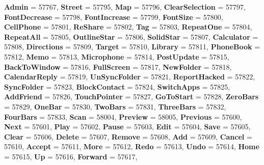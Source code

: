 \begin{DoxyCompactItemize}
{\bfseries Admin} = 57767, 
{\bfseries Street} = 57795, 
{\bfseries Map} = 57796, 
\newline
{\bfseries Clear\+Selection} = 57797, 
{\bfseries Font\+Decrease} = 57798, 
{\bfseries Font\+Increase} = 57799, 
{\bfseries Font\+Size} = 57800, 
\newline
{\bfseries Cell\+Phone} = 57801, 
{\bfseries Re\+Share} = 57802, 
{\bfseries Tag} = 57803, 
{\bfseries Repeat\+One} = 57804, 
\newline
{\bfseries Repeat\+All} = 57805, 
{\bfseries Outline\+Star} = 57806, 
{\bfseries Solid\+Star} = 57807, 
{\bfseries Calculator} = 57808, 
\newline
{\bfseries Directions} = 57809, 
{\bfseries Target} = 57810, 
{\bfseries Library} = 57811, 
{\bfseries Phone\+Book} = 57812, 
\newline
{\bfseries Memo} = 57813, 
{\bfseries Microphone} = 57814, 
{\bfseries Post\+Update} = 57815, 
{\bfseries Back\+To\+Window} = 57816, 
\newline
{\bfseries Full\+Screen} = 57817, 
{\bfseries New\+Folder} = 57818, 
{\bfseries Calendar\+Reply} = 57819, 
{\bfseries Un\+Sync\+Folder} = 57821, 
\newline
{\bfseries Report\+Hacked} = 57822, 
{\bfseries Sync\+Folder} = 57823, 
{\bfseries Block\+Contact} = 57824, 
{\bfseries Switch\+Apps} = 57825, 
\newline
{\bfseries Add\+Friend} = 57826, 
{\bfseries Touch\+Pointer} = 57827, 
{\bfseries Go\+To\+Start} = 57828, 
{\bfseries Zero\+Bars} = 57829, 
\newline
{\bfseries One\+Bar} = 57830, 
{\bfseries Two\+Bars} = 57831, 
{\bfseries Three\+Bars} = 57832, 
{\bfseries Four\+Bars} = 57833, 
\newline
{\bfseries Scan} = 58004, 
{\bfseries Preview} = 58005, 
{\bfseries Previous} = 57600, 
{\bfseries Next} = 57601, 
\newline
{\bfseries Play} = 57602, 
{\bfseries Pause} = 57603, 
{\bfseries Edit} = 57604, 
{\bfseries Save} = 57605, 
\newline
{\bfseries Clear} = 57606, 
{\bfseries Delete} = 57607, 
{\bfseries Remove} = 57608, 
{\bfseries Add} = 57609, 
\newline
{\bfseries Cancel} = 57610, 
{\bfseries Accept} = 57611, 
{\bfseries More} = 57612, 
{\bfseries Redo} = 57613, 
\newline
{\bfseries Undo} = 57614, 
{\bfseries Home} = 57615, 
{\bfseries Up} = 57616, 
{\bfseries Forward} = 57617, 
\newline

\end{DoxyCompactItemize}
